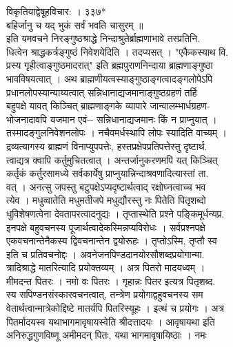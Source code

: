 \documentclass[11pt, openany]{book}
\begin{document}
{{{{{{{{{{{{{{{{{{{{{{{{{{{{{{{{{{{{{{{{{{{{{{{{{{{{{{{{{{{{{{{{{{{{{{{{{{{{{{{{{{{{{{{{{{{{{{{{{{{{{{{{{{{{{{{{{{{{{{{{ विकृतियाद्वेषूहविचार: । ३३७*\\
बहिर्जानु च यद् भुकं सर्वं भवति चासुरम् ॥\\
इति यमवचने निरङ्गुष्ठश्राद्धे निन्दाश्रुतेर्ब्राह्मणाभावे तस्प्रतिनि.\\
धित्वेन श्राद्धकर्त्रङ्गुष्ठं निवेशयेदिति । तदप्यसत् । "एकैकस्याथ वि.\\
प्रस्य गृहीत्वाङ्गुष्ठमादरात्" इति ब्रह्मपुराणनिन्दाया
ब्राह्मणाङ्गुष्ठा\\
भावविषयत्वात् । अथ ब्राह्मणीयत्वस्याङ्गुष्ठाङ्गत्वादङ्गलोपेऽपि\\
प्रधानलोपस्यान्याय्यत्वात् सन्निधानाद्यजमानाङ्गुष्ठग्रहणं तर्हि\\
बहुपक्षे यावत् किञ्चित् ब्राह्मणाङ्गके व्यापारे जान्वालम्भार्धग्रहण-\\
भोजनादावपि यजमान एवं-\/- सन्निधानाद्यजमानः किं न प्राप्नुयात् ।\\
तस्मादङ्गुलनिवेशनलोपः । नचैवमर्धस्थापि लोपः स्यादिति वाच्यम् ।\\
द्रव्यत्यागस्य ब्राह्मणं विनाप्युपपत्तेः, हस्तप्रक्षेपप्रतिपत्तेस्तु
दृष्टार्थ.\\
त्वाद्यत्र क्वापि कर्तुमुचितत्वात् । अन्तर्जानुकरणमपि यत् किञ्चित्\\
कर्तृकं कर्तुरसामध्ये सर्वकार्येषु प्राप्नुयान्निन्दाश्रवणादित्यास्तां
ता.\\
वत् । अनत्सु जपस्तु बटुपक्षेऽप्यदृष्टार्थत्वाद् रक्षोघ्नत्वाच्च भव\\
त्येव । मधुव्वातेति मधुमतीजपे मधुद्यौरस्तु नः पितेति पितृशब्दो\\
धुविशेषणत्वेना देवतापरत्वादनुद्यः । तृप्तास्थेति प्रश्ने
पङ्किमूर्धन्यप्र.\\
इनपक्षे बहुवचनस्य पूजार्थत्वादेकस्मिन्नप्यविरोधः । सर्वप्रश्नपक्षे\\
एकवचनान्तेनैकस्य द्विवचनान्तेन द्वयोरूहः । तृप्तोऽस्मि, तृप्तौ स्व\\
इति च प्रतिवचनोद्दः । अवनेजनपिण्डदानयोरसौशब्दप्रयोगान्मा.\\
त्रादिश्राद्धे मातरित्यादि प्रयोक्तव्यम् । अत्र पितरो मादयध्वम् ।\\
मीमदन्त पितरः । नमो वः पितरः । गृहान्नः पितर इत्यत्र पितृशब्द.\\
स्य सपिण्डनसंस्कारवचनत्वात्, तन्त्रेण प्रयोगाद्वहुवचनस्य सम\\
वेतार्थत्वान्मात्रेकोद्दिष्टे मातर्यपि पितरिस्यूहः । इत्थं च प्रयोगः ।
अत्र\\
पितर्मादयस्व यथाभागमावृषायस्वेति श्रीदत्तादयः । आवृषायथा इति\\
अनिरुद्धगुणविष्णू \textbar{} अमीमदन् पितः, यथा भागमावृषायिष्ठाः । नमः\\
}}}}}}}}}}}}}}}}}}}}}}}}}}}}}}}}}}}}}}}}}}}}}}}}}}}}}}}}}}}}}}}}}}}}}}}}}}}}}}}}}}}}}}}}}}}}}}}}}}}}}}}}}}}}}}}}}}}}}}}}
\end{document}
